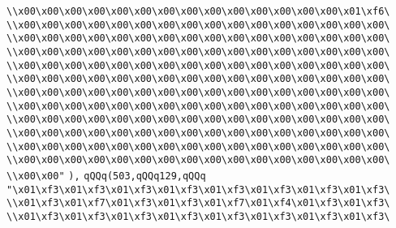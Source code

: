 \verb|\\x00\x00\x00\x00\x00\x00\x00\x00\x00\x00\x00\x00\x00\x00\x01\xf6\|\newline
\verb|\\x00\x00\x00\x00\x00\x00\x00\x00\x00\x00\x00\x00\x00\x00\x00\x00\|\newline
\verb|\\x00\x00\x00\x00\x00\x00\x00\x00\x00\x00\x00\x00\x00\x00\x00\x00\|\newline
\verb|\\x00\x00\x00\x00\x00\x00\x00\x00\x00\x00\x00\x00\x00\x00\x00\x00\|\newline
\verb|\\x00\x00\x00\x00\x00\x00\x00\x00\x00\x00\x00\x00\x00\x00\x00\x00\|\newline
\verb|\\x00\x00\x00\x00\x00\x00\x00\x00\x00\x00\x00\x00\x00\x00\x00\x00\|\newline
\verb|\\x00\x00\x00\x00\x00\x00\x00\x00\x00\x00\x00\x00\x00\x00\x00\x00\|\newline
\verb|\\x00\x00\x00\x00\x00\x00\x00\x00\x00\x00\x00\x00\x00\x00\x00\x00\|\newline
\verb|\\x00\x00\x00\x00\x00\x00\x00\x00\x00\x00\x00\x00\x00\x00\x00\x00\|\newline
\verb|\\x00\x00\x00\x00\x00\x00\x00\x00\x00\x00\x00\x00\x00\x00\x00\x00\|\newline
\verb|\\x00\x00\x00\x00\x00\x00\x00\x00\x00\x00\x00\x00\x00\x00\x00\x00\|\newline
\verb|\\x00\x00\x00\x00\x00\x00\x00\x00\x00\x00\x00\x00\x00\x00\x00\x00\|\newline
\verb|\\x00\x00"|\newline
\verb|),|\newline
\verb|qQQq(503,qQQq129,qQQq|\newline
\verb|"\x01\xf3\x01\xf3\x01\xf3\x01\xf3\x01\xf3\x01\xf3\x01\xf3\x01\xf3\|\newline
\verb|\\x01\xf3\x01\xf7\x01\xf3\x01\xf3\x01\xf7\x01\xf4\x01\xf3\x01\xf3\|\newline
\verb|\\x01\xf3\x01\xf3\x01\xf3\x01\xf3\x01\xf3\x01\xf3\x01\xf3\x01\xf3\|\newline
